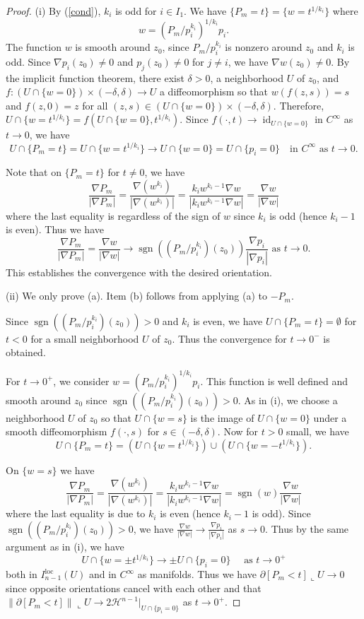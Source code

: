 \documentclass[pdflatex,sn-mathphys-num]{sn-jnl}%
\theoremstyle{thmstyleone}%
\theoremstyle{thmstyletwo}%
\theoremstyle{thmstylethree}%
\newcommand{\HH}{\mathcal{H}}
\newcommand{\loc}{\mathrm{loc}}
\DeclareMathOperator{\sgn}{sgn}
\DeclareMathOperator{\id}{id}
\begin{document}
\begin{proof}
	(i)  By (\ref{cond}), $k_i$ is odd for $i\in I_1$. We have $\{P_m=t\}=\{w=t^{1/k_i}\}$ where 
	\begin{equation}\label{w}
		w=\left(P_m/p_i^{k_i}\right)^{1/k_i}p_i.
	\end{equation}
	The function $w$ is smooth around $z_0$, since $P_m/p_i^{k_i}$ is nonzero around $z_0$ and $k_i$ is odd. Since $\nabla p_i(z_0)\neq 0$ and $p_j(z_0)\neq0$ for $j\neq i$, we have $\nabla w(z_0)\neq0$. By the implicit function theorem, there exist $\delta>0$, a neighborhood $U$ of $z_0$, and $f:(U\cap \{w=0\})\times (-\delta,\delta)\to U$ a diffeomorphism so that $w(f(z,s))=s$ and $f(z,0)=z$ for all $(z,s)\in (U\cap \{w=0\})\times(-\delta,\delta)$. Therefore, $U\cap \{w=t^{1/k_i}\}=f(U\cap \{w=0\},t^{1/k_i})$. Since $f(\cdot,t)\to \id_{U\cap \{w=0\}}$ in $C^{\infty}$ as $t\to0$, we have \[U\cap\{P_m=t\}=U\cap\{w=t^{1/k_i}\}\to U\cap\{w=0\}=U\cap \{p_i=0\}\quad\text{in } C^{\infty}\text{ as }t\to0.\]
	
	Note that on $\{P_m=t\}$ for $t\neq 0$, we have \[\frac{\nabla P_m}{|\nabla P_m|}=\frac{\nabla (w^{k_i})}{|\nabla (w^{k_i})|}=\frac{k_iw^{k_i-1}\nabla w}{|k_iw^{k_i-1}\nabla w|}=\frac{\nabla w}{|\nabla w|}\] where the last equality is regardless of the sign of $w$ since $k_i$ is odd (hence $k_i-1$ is even). Thus we have \[\frac{\nabla P_m}{|\nabla P_m|}=\frac{\nabla w}{|\nabla w|}\to \sgn \left(\left(P_m/p_i^{k_i}\right)(z_0)\right)\frac{\nabla p_i}{|\nabla p_i|}\text{ as }t\to0.\] This establishes the convergence with the desired orientation.
	
	(ii) We only prove (a). Item (b) follows from applying (a) to $-P_m$.
	
	Since $\sgn ((P_m/p_i^{k_i})(z_0))>0$ and $k_i$ is even, we have $U\cap\{P_m=t\}=\emptyset$ for $t<0$ for a small neighborhood $U$ of $z_0$. Thus the convergence for $t\to0^-$ is obtained. 
	
	For $t\to0^+$, we consider $w=\left(P_m/p_i^{k_i}\right)^{1/k_i}p_i$. This function is well defined and smooth around $z_0$ since $\sgn ((P_m/p_i^{k_i})(z_0))>0$. As in (i), we choose a neighborhood $U$ of $z_0$ so that $U\cap \{w=s\}$ is the image of $U\cap \{w=0\}$ under a smooth diffeomorphism $f(\cdot,s)$ for $s\in (-\delta,\delta)$. Now for $t> 0$ small, we have  \[U\cap\{P_m=t\}=(U\cap\{w=t^{1/k_i}\})\cup(U\cap\{w=-t^{1/k_i}\}).\]
	
	On $\{w=s\}$ we have \[\frac{\nabla P_m}{|\nabla P_m|}=\frac{\nabla (w^{k_i})}{|\nabla (w^{k_i})|}=\frac{k_iw^{k_i-1}\nabla w}{|k_iw^{k_i-1}\nabla w|}=\sgn(w)\frac{\nabla w}{|\nabla w|}\] where the last equality is due to $k_i$ is even (hence $k_i-1$ is odd). Since $\sgn ((P_m/p_i^{k_i})(z_0))>0$, we have $\frac{\nabla w}{|\nabla w|}\to \frac{\nabla p_i}{|\nabla p_i|}$ as $s\to0$. Thus by the same argument as in (i), we have \[U\cap\{w=\pm t^{1/k_i}\}\to \pm U\cap \{p_i=0\}\quad\text{ as }t\to0^+\] both in $I_{n-1}^\loc(U)$ and in $C^\infty$ as manifolds. Thus we have $\partial[P_m<t]\llcorner U\to0$ since opposite orientations cancel with each other and that $\|\partial[P_m<t]\|\llcorner U\to 2 \HH^{n-1}|_{U\cap \{p_i=0\}}$ as $t\to0^+$.
\end{proof}
\end{document}
